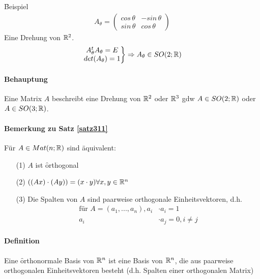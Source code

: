 \f{Beispiel}
\begin{align}
A_{\theta} = \begin{pmatrix} cos\, \theta & - sin\, \theta \\ sin\, \theta & cos\, \theta\end{pmatrix}
\end{align}
Eine Drehung von $\mathbb{R}^2$.
\begin{align}
\left . \begin{matrix} A_{\theta}^t A_{\theta} = E \\ det(A_{\theta}) = 1 \end{matrix} \right \} \Rightarrow A_{\theta} \in SO(2; \mathbb{R})
\end{align}

\paragraph{Behauptung}
Eine Matrix $A$ beschreibt eine Drehung von $\mathbb{R}^2$ oder $\mathbb{R}^3$ gdw $A \in SO(2; \mathbb{R})$ oder $A \in SO(3; \mathbb{R})$.

\paragraph{Bemerkung zu Satz \ref{satz311}}
Für $A \in Mat(n; \mathbb{R})$ sind äquivalent:
\begin{itemize}
\item[(1)] $A$ ist \f{orthogonal}
\item[(2)] $((Ax) \cdot (Ay)) = (x\cdot y) \forall x, y \in \mathbb{R}^n$
\item[(3)] Die Spalten von $A$ sind paarweise orthogonale Einheitsvektoren, d.h.
\begin{align}
\text{für } A = (a_1, ..., a_n), a_i &\cdot a_i = 1 \\
a_i &\cdot a_j = 0, i \neq j
\end{align}
\end{itemize}

\paragraph{Definition}
Eine \f{orthonormale Basis} von $\mathbb{R}^n$ ist eine Basis von $\mathbb{R}^n$, die aus paarweise orthogonalen Einheitsvektoren besteht (d.h. Spalten einer orthogonalen Matrix)

